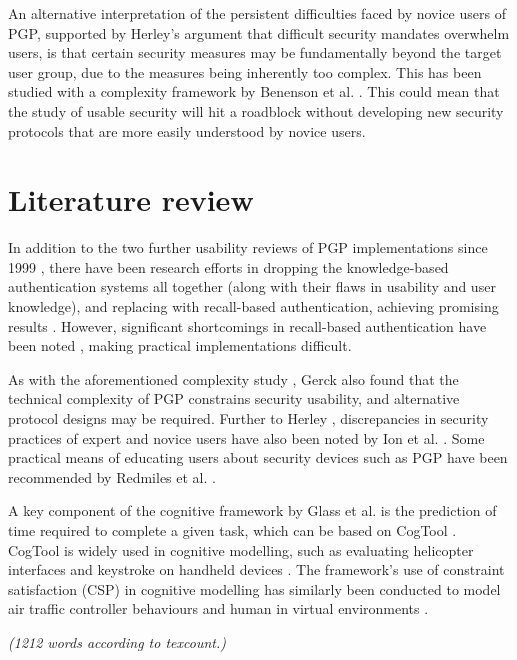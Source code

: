 \documentclass[11pt]{article}
\begin{document}
An alternative interpretation of the persistent difficulties faced by novice users of PGP, supported by Herley's \cite{herley2014more} argument that difficult security mandates overwhelm users, is that certain security measures may be fundamentally beyond the target user group, due to the measures being inherently too complex. This has been studied with a complexity framework by Benenson et al. \cite{benenson2015maybe}. This could mean that the study of usable security will hit a roadblock without developing new security protocols that are more easily understood by novice users.

\section{Literature review}

In addition to the two further usability reviews of PGP implementations since 1999 \cite{sheng2006johnny, ruoti2015johnny}, there have been research efforts in dropping the knowledge-based authentication
systems all together (along with their flaws in usability and user knowledge), and replacing with recall-based authentication, achieving promising results \cite{dhamija2000deja}. However, significant shortcomings in recall-based authentication have been noted \cite{wiedenbeck2005passpoints}, making practical implementations difficult. 

As with the aforementioned complexity study \cite{benenson2015maybe}, Gerck \cite{gerck2007secure} also found that the technical complexity of PGP constrains security usability, and alternative protocol designs may be required. Further to Herley \cite{herley2014more}, discrepancies in security practices of expert and novice users have also been noted by Ion et al. \cite{ion2015no}. Some practical means of educating users about security devices such as PGP have been recommended by Redmiles et al. \cite{redmiles2016think}. 

A key component of the cognitive framework by Glass et al. \cite[III. A.]{glass2016usability} is the prediction of time required to complete a given task, which can be based on CogTool \cite{bellamy2011deploying}. CogTool is widely used in cognitive modelling, such as evaluating helicopter interfaces \cite{ludwig2006comparing} and keystroke on handheld devices \cite{luo2005predicting}. The framework's use of constraint satisfaction (CSP) in cognitive modelling has similarly been conducted to model air traffic controller behaviours \cite{cerone2005formal} and human in virtual environments \cite{smith1999using}.

\emph{(1212 words according to texcount.)}


\footnotesize{}
\end{document}
